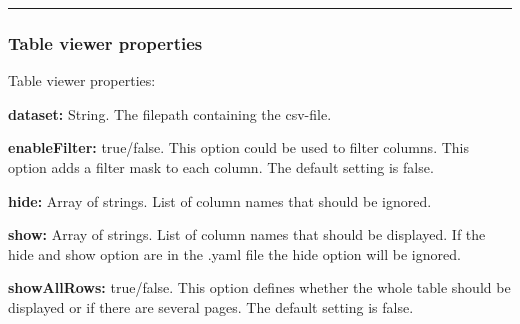 \begin{Shaded}
\begin{Highlighting}[]
\KeywordTok{:}
\AttributeTok{  }\KeywordTok{:}
\AttributeTok{    }\KeywordTok{{-}}\AttributeTok{ }\KeywordTok{:}\AttributeTok{ }
\AttributeTok{      }\KeywordTok{:}
\AttributeTok{      }\KeywordTok{:}\AttributeTok{ }
\AttributeTok{      }\KeywordTok{:}\AttributeTok{ }
\AttributeTok{      }\KeywordTok{:}\AttributeTok{ }\KeywordTok{[}\KeywordTok{,}\KeywordTok{]}
\AttributeTok{      }\KeywordTok{:}\AttributeTok{ }\KeywordTok{[}\KeywordTok{]}
\AttributeTok{      }\KeywordTok{:}\AttributeTok{ }
\end{Highlighting}
\end{Shaded}

\begin{center}\rule{0.5\linewidth}{0.5pt}\end{center}

\hypertarget{table-viewer-properties}{%
\subsubsection{Table viewer properties}\label{table-viewer-properties}}

Table viewer properties:

\textbf{dataset:} String. The filepath containing the csv-file.

\textbf{enableFilter:} true/false. This option could be used to filter
columns. This option adds a filter mask to each column. The default
setting is false.

\textbf{hide:} Array of strings. List of column names that should be
ignored.

\textbf{show:} Array of strings. List of column names that should be
displayed. If the hide and show option are in the .yaml file the hide
option will be ignored.

\textbf{showAllRows:} true/false. This option defines whether the whole
table should be displayed or if there are several pages. The default
setting is false.
